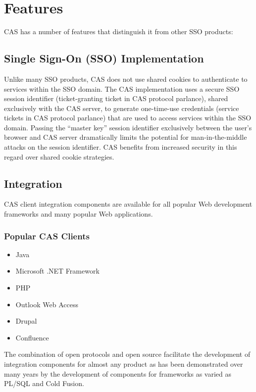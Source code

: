 \documentclass[a4paper]{book}
\begin{document}
\section{Features}

CAS has a number of features that distinguish it from other SSO products:

\subsection{Single Sign-On (SSO) Implementation}

Unlike many SSO products, CAS does not use shared cookies to authenticate to services within the SSO domain. The CAS implementation uses a secure SSO session identifier (ticket-granting ticket in CAS protocol parlance), shared exclusively with the CAS server, to generate one-time-use credentials (service tickets in CAS protocol parlance) that are used to access services within the SSO domain. Passing the “master key” session identifier exclusively between the user's browser and CAS server dramatically limits the potential for man-in-the-middle attacks on the session identifier. CAS benefits from increased security in this regard over shared cookie strategies.

\subsection{Integration}

CAS client integration components are available for all popular Web development frameworks and many popular Web applications.

\subsubsection{Popular CAS Clients}

\begin{itemize}
\item
  Java
\item
  Microsoft .NET Framework
\item
  PHP
\item
  Outlook Web Access
\item
  Drupal
\item
  Confluence
\end{itemize}
The combination of open protocols and open source facilitate the development of integration components for almost any product as has been demonstrated over many years by the development of components for frameworks as varied as PL/SQL and Cold Fusion.
\end{document}
